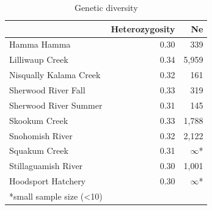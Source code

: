 \documentclass[12pt, one column]{article}
\begin{document}
\begin{table}[H]
\caption{Genetic diversity} 
\begin{tabular}{lrr}
\toprule
{} & Heterozygosity &     Ne \\
\midrule
Hamma Hamma            &           0.30 &    339 \\
Lilliwaup Creek        &           0.34 &  5,959 \\
Nisqually Kalama Creek &           0.32 &    161 \\
Sherwood River Fall    &           0.33 &    319 \\
Sherwood River Summer  &           0.31 &    145 \\
Skookum Creek          &           0.33 &  1,788 \\
Snohomish River        &           0.32 &  2,122 \\
Squakum Creek          &           0.31 & $\infty$* \\
Stillaguamish River    &           0.30 &  1,001 \\
Hoodsport Hatchery     &           0.30 & $\infty$* \\
\bottomrule
\multicolumn{3}{l}{*small sample size (\textless10)}
\end{tabular}

\end {table}

\pagebreak
\end{document}
